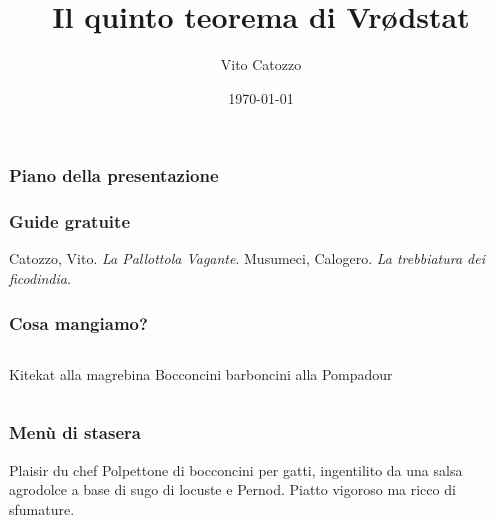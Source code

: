 \documentclass[12pt]{beamer}
\title{Il quinto teorema di Vr\o dstat} %
\author{Vito Catozzo}
\date{\today}
\begin{document}
\frame{\titlepage} %
\begin{frame}
  \frametitle{Piano della presentazione}
  \tableofcontents
\end{frame}
\begin{frame}
  \frametitle{Guide gratuite}
	\begin{thebibliography}{Wel66}
			Catozzo, Vito.
			\newblock \textit{La Pallottola Vagante}.
			Musumeci, Calogero.
			\newblock \textit{La trebbiatura dei ficodindia}.
	\end{thebibliography}
\end{frame}
\begin{frame}
  \frametitle{Cosa mangiamo?}
	\begin{columns}
		Kitekat alla magrebina
		Bocconcini barboncini alla Pompadour
	\end{columns}
\end{frame}
\begin{frame}
  \frametitle{Menù di stasera}
	\begin{block}{Plaisir du chef}
		Polpettone di bocconcini per gatti, ingentilito da una salsa agrodolce a base di sugo di locuste e Pernod. Piatto vigoroso ma ricco di sfumature. 
	\end{block}
\end{frame}
\end{document}
